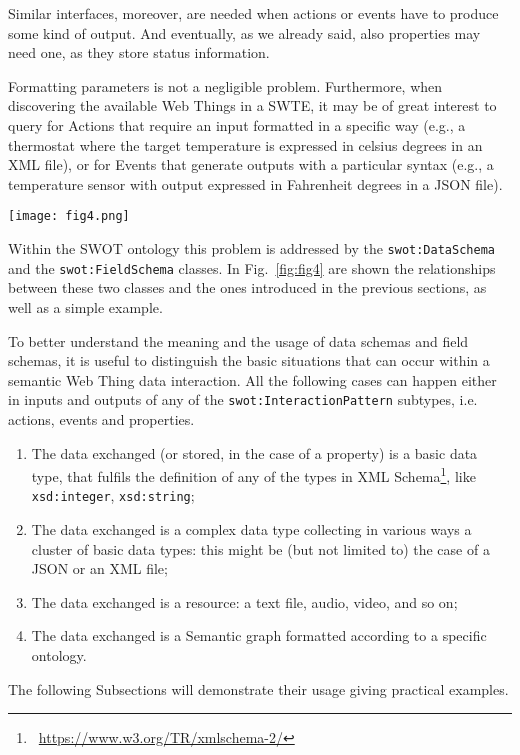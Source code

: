 Similar interfaces, moreover, are needed when actions or events have to produce some kind of output. And eventually, as we already said, also properties may need one, as they store status information.

Formatting parameters is not a negligible problem. Furthermore, when discovering the available Web Things in a SWTE, it may be of great interest to query for Actions that require an input formatted in a specific way (e.g., a thermostat where the target temperature is expressed in celsius degrees in an XML file), or for Events that generate outputs with a particular syntax (e.g., a temperature sensor with output expressed in Fahrenheit degrees in a JSON file).

\begin{figure*}
\vspace{10pt}
\centering
\texttt{[image: fig4.png]}
\vspace{10pt}
\caption{\texttt{swot:DataSchema} and \texttt{swot:FieldSchema} ontology subgraph, together with an example of a simple \texttt{xsd:string} datas chema inclusion.}
\label{fig:fig4}
\end{figure*}

Within the SWOT ontology this problem is addressed by the \texttt{swot:DataSchema} and the \texttt{swot:FieldSchema} classes. In Fig.~\ref{fig:fig4} are shown the relationships between these two classes and the ones introduced in the previous sections, as well as a simple example. 

To better understand the meaning and the usage of data schemas and field schemas, it is useful to distinguish the basic situations that can occur within a semantic Web Thing data interaction. All the following cases can happen either in inputs and outputs of any of the \texttt{swot:InteractionPattern} subtypes, i.e. actions, events and properties.

\begin{enumerate}
    \item The data exchanged (or stored, in the case of a property) is a basic data type, that fulfils the definition of any of the types in XML Schema\footnote{\faLink~\url{https://www.w3.org/TR/xmlschema-2/}}, like \texttt{xsd:integer}, \texttt{xsd:string};
    \item The data exchanged is a complex data type collecting in various ways a cluster of basic data types: this might be (but not limited to) the case of a JSON or an XML file; 
    \item The data exchanged is a resource: a text file, audio, video, and so on;
    \item The data exchanged is a Semantic graph formatted according to a specific ontology.
\end{enumerate}
The following Subsections will demonstrate their usage giving practical examples.

